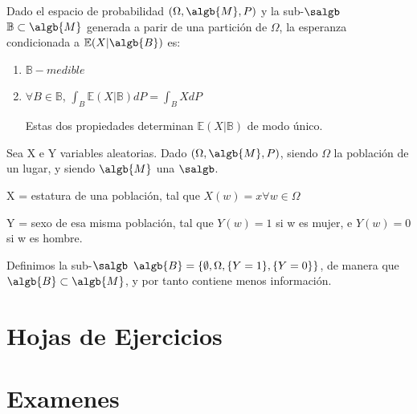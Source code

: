 \documentclass{apuntes}
\begin{document}
\begin{defn}
Dado el espacio de probabilidad $(\Omega, \algb{M}, P)$ y la sub-$\salgb$ $\mathbb{B}\subset\algb{M}$ generada a parir de una partición de $\Omega$, la esperanza condicionada a $\mathbb{E}(X|\algb{B})$ es:
\begin{enumerate}
\item $\mathbb{B}-medible$
\item $\forall B \in \mathbb{B}$, $\int_{B}\mathbb{E}(X|\mathbb{B})dP=\int_{B}XdP$

Estas dos propiedades determinan $\mathbb{E}(X|\mathbb{B})$ de modo único.
\end{enumerate}
\end{defn}

\begin{example}
Sea X e Y variables aleatorias. Dado $(\Omega, \algb{M}, P)$, siendo $\Omega$ la población de un lugar, y siendo $\algb{M}$ una $\salgb$.

X = estatura de una población, tal que $X(w)=x \forall w \in \Omega$

Y = sexo de esa misma población, tal que $Y(w)=1$ si w es mujer, e $Y(w)=0$ si w es hombre.

Definimos la sub-$\salgb$ $\algb{B}=\{\emptyset, \Omega, \{Y=1\}, \{Y=0\}\}$, de manera que $\algb{B} \subset \algb{M}$, y por tanto contiene menos información.
\end{example}











%



\chapter{Hojas de Ejercicios}


\chapter{Examenes}

\end{document}
